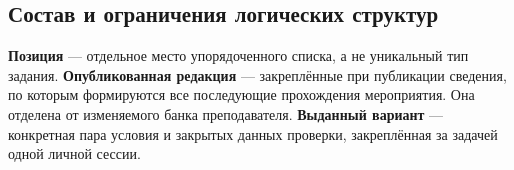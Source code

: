 \documentclass[12pt,a4paper]{article}
\begin{document}
\subsection{Состав и ограничения логических структур}\label{ux441ux43eux441ux442ux430ux432-ux438-ux43eux433ux440ux430ux43dux438ux447ux435ux43dux438ux44f-ux43bux43eux433ux438ux447ux435ux441ux43aux438ux445-ux441ux442ux440ux443ux43aux442ux443ux440}

\hypertarget{состав-и-ограничения-логических-структур}{}

\textbf{Позиция} --- отдельное место упорядоченного списка, а не уникальный тип задания. \textbf{Опубликованная редакция} --- закреплённые при публикации сведения, по которым формируются все последующие прохождения мероприятия. Она отделена от изменяемого банка преподавателя. \textbf{Выданный вариант} --- конкретная пара условия и закрытых данных проверки, закреплённая за задачей одной личной сессии.
\end{document}
